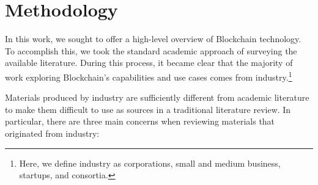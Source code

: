 
\section{Methodology}
\label{sec:method}

In this work, we sought to offer a high-level overview of Blockchain technology.
To accomplish this, we took the standard academic approach of surveying the available literature.
During this process, it became clear that the majority of work exploring Blockchain's capabilities and use cases comes from industry.\footnote{Here, we define industry as corporations, small and medium business, startups, and consortia.}

Materials produced by industry are sufficiently different from academic literature to make them difficult to use as sources in a traditional literature review.
In particular, there are three main concerns when reviewing materials that originated from industry:

